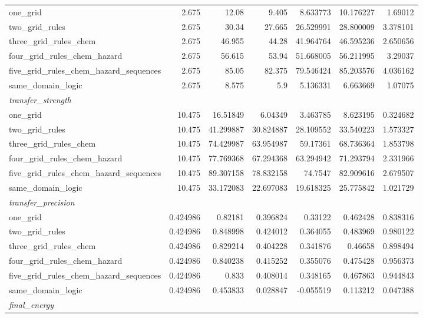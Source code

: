 \begin{tabular}{lrrrrrr}
  one_grid & 2.675 & 12.08 & 9.405 & 8.633773 & 10.176227 & 1.69012 \\
  two_grid_rules & 2.675 & 30.34 & 27.665 & 26.529991 & 28.800009 & 3.378101 \\
  three_grid_rules_chem & 2.675 & 46.955 & 44.28 & 41.964764 & 46.595236 & 2.650656 \\
  four_grid_rules_chem_hazard & 2.675 & 56.615 & 53.94 & 51.668005 & 56.211995 & 3.29037 \\
  five_grid_rules_chem_hazard_sequences & 2.675 & 85.05 & 82.375 & 79.546424 & 85.203576 & 4.036162 \\
  same_domain_logic & 2.675 & 8.575 & 5.9 & 5.136331 & 6.663669 & 1.07075 \\
  \multicolumn{7}{l}{\textit{transfer_strength}} \\
  one_grid & 10.475 & 16.51849 & 6.04349 & 3.463785 & 8.623195 & 0.324682 \\
  two_grid_rules & 10.475 & 41.299887 & 30.824887 & 28.109552 & 33.540223 & 1.573327 \\
  three_grid_rules_chem & 10.475 & 74.429987 & 63.954987 & 59.17361 & 68.736364 & 1.853798 \\
  four_grid_rules_chem_hazard & 10.475 & 77.769368 & 67.294368 & 63.294942 & 71.293794 & 2.331966 \\
  five_grid_rules_chem_hazard_sequences & 10.475 & 89.307158 & 78.832158 & 74.7547 & 82.909616 & 2.679507 \\
  same_domain_logic & 10.475 & 33.172083 & 22.697083 & 19.618325 & 25.775842 & 1.021729 \\
  \multicolumn{7}{l}{\textit{transfer_precision}} \\
  one_grid & 0.424986 & 0.82181 & 0.396824 & 0.33122 & 0.462428 & 0.838316 \\
  two_grid_rules & 0.424986 & 0.848998 & 0.424012 & 0.364055 & 0.483969 & 0.980122 \\
  three_grid_rules_chem & 0.424986 & 0.829214 & 0.404228 & 0.341876 & 0.46658 & 0.898494 \\
  four_grid_rules_chem_hazard & 0.424986 & 0.840238 & 0.415252 & 0.355076 & 0.475428 & 0.956373 \\
  five_grid_rules_chem_hazard_sequences & 0.424986 & 0.833 & 0.408014 & 0.348165 & 0.467863 & 0.944843 \\
  same_domain_logic & 0.424986 & 0.453833 & 0.028847 & -0.055519 & 0.113212 & 0.047388 \\
  \multicolumn{7}{l}{\textit{final_energy}} \\

\end{tabular}

